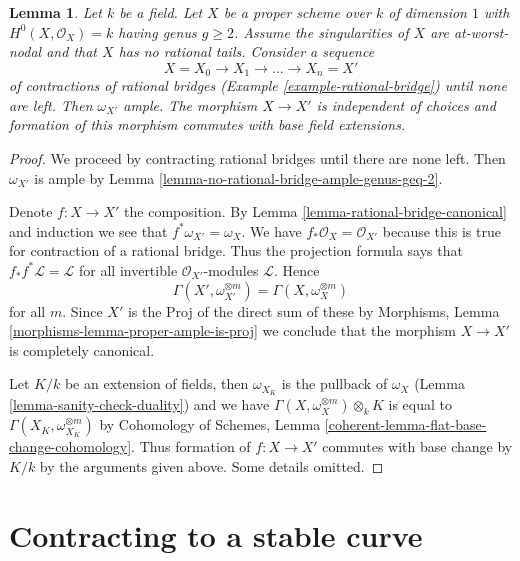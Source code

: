 \documentclass{stacks-project}
\theoremstyle{plain}
\newtheorem{lemma}[subsection]{Lemma}
\theoremstyle{definition}
\theoremstyle{remark}
\numberwithin{equation}{subsection}
\begin{document}
\begin{lemma}
\label{lemma-contracting-rational-bridges}
Let $k$ be a field. Let $X$ be a proper scheme over $k$ of dimension $1$
with $H^0(X, \mathcal{O}_X) = k$ having genus $g \geq 2$.
Assume the singularities of $X$ are at-worst-nodal and that
$X$ has no rational tails. Consider a sequence
$$
X = X_0 \to X_1 \to \ldots \to X_n = X'
$$
of contractions of rational bridges
(Example \ref{example-rational-bridge}) until none are left.
Then $\omega_{X'}$ ample.
The morphism $X \to X'$ is independent of choices and
formation of this morphism commutes with base field extensions.
\end{lemma}

\begin{proof}
We proceed by contracting rational bridges until there are none
left. Then $\omega_{X'}$ is ample by
Lemma \ref{lemma-no-rational-bridge-ample-genus-geq-2}.

\medskip\noindent
Denote $f : X \to X'$ the composition. By
Lemma \ref{lemma-rational-bridge-canonical} and induction we see that
$f^*\omega_{X'} = \omega_X$.
We have $f_*\mathcal{O}_X = \mathcal{O}_{X'}$
because this is true for contraction of a rational bridge.
Thus the projection formula says that
$f_*f^*\mathcal{L} = \mathcal{L}$ for all invertible
$\mathcal{O}_{X'}$-modules $\mathcal{L}$.
Hence
$$
\Gamma(X', \omega_{X'}^{\otimes m}) = \Gamma(X, \omega_X^{\otimes m})
$$
for all $m$. Since $X'$ is the Proj of the direct sum of these
by Morphisms, Lemma \ref{morphisms-lemma-proper-ample-is-proj}
we conclude that the morphism $X \to X'$ is completely canonical.

\medskip\noindent
Let $K/k$ be an extension of fields, then
$\omega_{X_K}$ is the pullback of $\omega_X$
(Lemma \ref{lemma-sanity-check-duality}) and we have
$\Gamma(X, \omega_X^{\otimes m}) \otimes_k K$
is equal to
$\Gamma(X_K, \omega_{X_K}^{\otimes m})$
by
Cohomology of Schemes, Lemma \ref{coherent-lemma-flat-base-change-cohomology}.
Thus formation of $f : X \to X'$ commutes with base change by
$K/k$ by the arguments given above. Some details omitted.
\end{proof}






\section{Contracting to a stable curve}
\label{section-contracting-to-stable}
\end{document}
